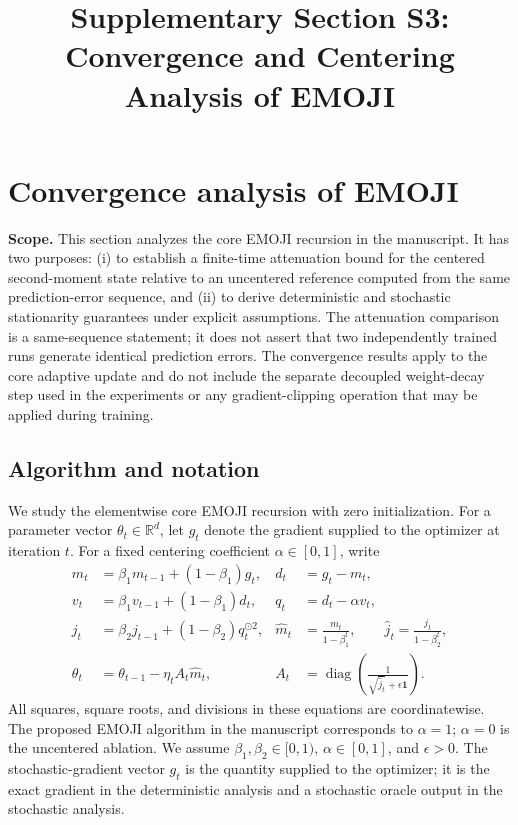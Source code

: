 \documentclass[11pt]{article}
\title{Supplementary Section S3: Convergence and Centering Analysis of EMOJI}
\author{}
\date{}
\newcommand{\R}{\mathbb{R}}
\newcommand{\diag}{\operatorname{diag}}
\begin{document}
\renewcommand{\thesection}{S\arabic{section}}
\renewcommand{\thesubsection}{\thesection.\arabic{subsection}}
\setcounter{section}{2}
\maketitle
\section{Convergence analysis of EMOJI}

\noindent\textbf{Scope.} This section analyzes the core EMOJI recursion in the manuscript. It has two purposes: (i) to establish a finite-time attenuation bound for the centered second-moment state relative to an uncentered reference computed from the same prediction-error sequence, and (ii) to derive deterministic and stochastic stationarity guarantees under explicit assumptions. The attenuation comparison is a same-sequence statement; it does not assert that two independently trained runs generate identical prediction errors. The convergence results apply to the core adaptive update and do not include the separate decoupled weight-decay step used in the experiments or any gradient-clipping operation that may be applied during training.

\subsection{Algorithm and notation}
We study the elementwise core EMOJI recursion with zero initialization. For a parameter vector $\theta_t\in\R^d$, let $g_t$ denote the gradient supplied to the optimizer at iteration $t$. For a fixed centering coefficient $\alpha\in[0,1]$, write
\begin{align}
 m_t&=\beta_1m_{t-1}+(1-\beta_1)g_t,
 &d_t&=g_t-m_t,\label{eq:m-d}\\
 v_t&=\beta_1v_{t-1}+(1-\beta_1)d_t,
 &q_t&=d_t-\alpha v_t,\label{eq:v-q}\\
 j_t&=\beta_2j_{t-1}+(1-\beta_2)q_t^{\odot2},
 &\widehat m_t&=\frac{m_t}{1-\beta_1^t},\qquad
 \widehat j_t=\frac{j_t}{1-\beta_2^t},\label{eq:j-bias}\\
 \theta_t&=\theta_{t-1}-\eta_t A_t\widehat m_t,
 &A_t&=\diag\!\left(\frac{1}{\sqrt{\widehat j_t}+\epsilon\mathbf 1}\right).
 \label{eq:update}
\end{align}
All squares, square roots, and divisions in these equations are coordinatewise. The proposed EMOJI algorithm in the manuscript corresponds to $\alpha=1$; $\alpha=0$ is the uncentered ablation. We assume $\beta_1,\beta_2\in[0,1)$, $\alpha\in[0,1]$, and $\epsilon>0$. The stochastic-gradient vector $g_t$ is the quantity supplied to the optimizer; it is the exact gradient in the deterministic analysis and a stochastic oracle output in the stochastic analysis.
\end{document}
